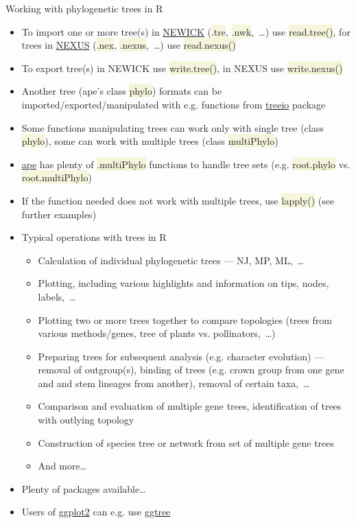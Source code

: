 \documentclass[compress, ucs, xelatex, 11pt, xcolor=svgnames, aspectratio=169,
	hyperref={
		bookmarks=true,
		unicode=true,
		colorlinks=true,
		pdftitle={Molecular data in R},
		plainpages=false,
		pdfauthor={Vojtech Zeisek},
		pdfsubject={Course about phylogeny and evolution in R},
		pdfcreator={XeLaTeX},
		pdfkeywords={R, evolution, phylogeny, molecular data},
		linkcolor=Crimson, %
		anchorcolor=Magenta, %
		citecolor=Magenta, %
		filecolor=Magenta, %
		menucolor=Magenta, %
		urlcolor=DodgerBlue, %
		pdftex},
	url={hyphens, lowtilde} %
	]{beamer}
\renewcommand{\texttt}[1]{\colorbox{Beige}{{\ttfamily #1}}}
\begin{document}
\begin{frame}[allowframebreaks]{Working with phylogenetic trees in R}
	\begin{itemize}
		\item To import one or more tree(s) in \href{https://en.wikipedia.org/wiki/Newick_format}{NEWICK} (\texttt{*.tre}, \texttt{*.nwk},~\ldots) use \texttt{read.tree()}, for trees in \href{https://en.wikipedia.org/wiki/Nexus_file}{NEXUS} (\texttt{*.nex}, \texttt{*.nexus},~\ldots) use \texttt{read.nexus()}
		\item To export tree(s) in NEWICK use \texttt{write.tree()}, in NEXUS use \texttt{write.nexus()}
		\item Another tree (ape's class \texttt{phylo}) formats can be imported/exported/manipulated with e.g. functions from \href{https://bioconductor.org/packages/release/bioc/html/treeio.html}{treeio} package
		\item Some functions manipulating trees can work only with single tree (class \texttt{phylo}), some can work with multiple trees (class \texttt{multiPhylo})
		\item \href{https://CRAN.R-project.org/package=ape}{ape} has plenty of \texttt{*.multiPhylo} functions to handle tree sets (e.g. \texttt{root.phylo} vs. \texttt{root.multiPhylo})
		\item If the function needed does not work with multiple trees, use \texttt{lapply()} (see further examples)
		\item Typical operations with trees in R
		\begin{itemize}
			\item Calculation of individual phylogenetic trees --- NJ, MP, ML,~\ldots
			\item Plotting, including various highlights and information on tips, nodes, labels,~\ldots
			\item Plotting two or more trees together to compare topologies (trees from various methods/genes, tree of plants vs. pollinators,~\ldots)
			\item Preparing trees for subsequent analysis (e.g. character evolution) --- removal of outgroup(s), binding of trees (e.g. crown group from one gene and and stem lineages from another), removal of certain taxa,~\ldots
			\item Comparison and evaluation of multiple gene trees, identification of trees with outlying topology
			\item Construction of species tree or network from set of multiple gene trees
			\item And more\ldots
		\end{itemize}
		\item Plenty of packages available\ldots
		\item Users of \href{https://ggplot2.tidyverse.org/}{ggplot2} can e.g. use \href{https://bioconductor.org/packages/release/bioc/html/ggtree.html}{ggtree}
	\end{itemize}
\end{frame}
\end{document}
